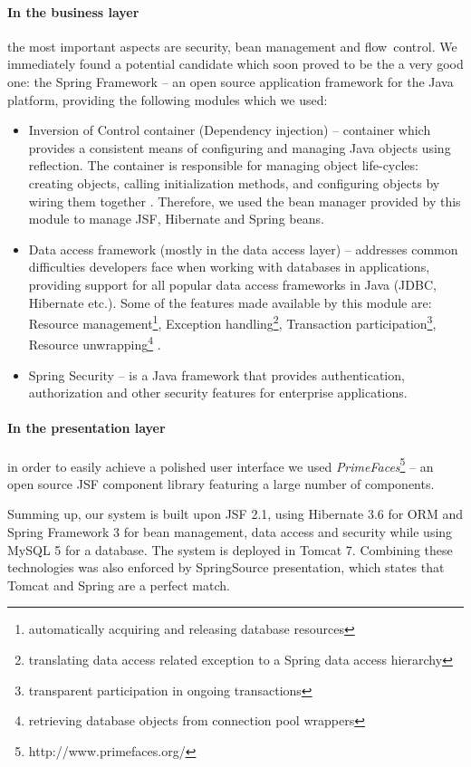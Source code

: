 \paragraph{In the business layer} the most important aspects are security, bean management and flow~control. We immediately found a potential candidate which soon proved to be the a very good one: the Spring Framework -- an open source application framework for the Java platform, providing the following modules which we used:
\begin{itemize}
  \item Inversion of Control container (Dependency injection) -- container which provides a consistent means of configuring and managing Java objects using reflection. The container is responsible for managing object life-cycles: creating objects, calling initialization methods, and configuring objects by wiring them together \cite{wiki_spring}. Therefore, we used the bean manager provided by this module to manage JSF, Hibernate and Spring beans.
  \item Data access framework (mostly in the data access layer) -- addresses common difficulties developers face when working with databases in applications, providing support for all popular data access frameworks in Java (JDBC, Hibernate etc.). Some of the  features made available by this module are: Resource management\footnote{automatically acquiring and releasing database resources}, Exception handling\footnote{translating data access related exception to a Spring data access hierarchy}, Transaction  participation\footnote{transparent participation in ongoing transactions}, Resource unwrapping\footnote{retrieving database objects from connection pool wrappers} \cite{wiki_spring}.
  \item Spring Security -- is a Java framework that provides authentication, authorization and other security features for enterprise applications.
\end{itemize}

\paragraph{In the presentation layer} in order to easily achieve a polished user interface we used \emph{PrimeFaces}\footnote{http://www.primefaces.org/} -- an open source JSF component library featuring a large number of components.

\noindent Summing up, our system is built upon JSF 2.1, using Hibernate 3.6 for ORM and Spring Framework 3 for bean management, data access and security while using MySQL 5 for a database. The system is deployed in Tomcat 7. Combining these technologies was also enforced by SpringSource presentation\cite{tomcat_spring}, which states that Tomcat and Spring are a perfect match.
\\

